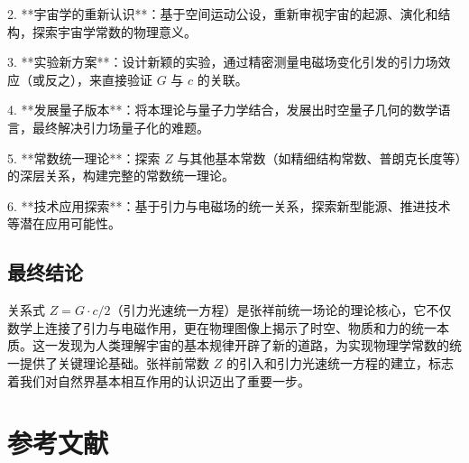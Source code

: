 \documentclass[12pt,a4paper]{article}
\begin{document}
2. **宇宙学的重新认识**：基于空间运动公设，重新审视宇宙的起源、演化和结构，探索宇宙学常数的物理意义。

3. **实验新方案**：设计新颖的实验，通过精密测量电磁场变化引发的引力场效应（或反之），来直接验证 $G$ 与 $c$ 的关联。

4. **发展量子版本**：将本理论与量子力学结合，发展出时空量子几何的数学语言，最终解决引力场量子化的难题。

5. **常数统一理论**：探索 $Z$ 与其他基本常数（如精细结构常数、普朗克长度等）的深层关系，构建完整的常数统一理论。

6. **技术应用探索**：基于引力与电磁场的统一关系，探索新型能源、推进技术等潜在应用可能性。

\subsection{最终结论}
\label{subsection:final_conclusion}

关系式 $Z = G \cdot c / 2$（引力光速统一方程）是张祥前统一场论的理论核心，它不仅数学上连接了引力与电磁作用，更在物理图像上揭示了时空、物质和力的统一本质。这一发现为人类理解宇宙的基本规律开辟了新的道路，为实现物理学常数的统一提供了关键理论基础。张祥前常数 $Z$ 的引入和引力光速统一方程的建立，标志着我们对自然界基本相互作用的认识迈出了重要一步。

\newpage
\section{参考文献}
\label{section:references}
\end{document}
